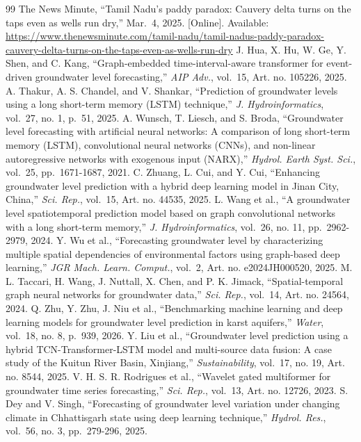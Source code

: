 \documentclass[conference]{IEEEtran}
\begin{document}
\begin{thebibliography}{99}
 The News Minute, ``Tamil Nadu's paddy paradox: Cauvery delta turns on the taps even as wells run dry,'' Mar.~4, 2025. {[}Online{]}. Available: \url{https://www.thenewsminute.com/tamil-nadu/tamil-nadus-paddy-paradox-cauvery-delta-turns-on-the-taps-even-as-wells-run-dry}
 J. Hua, X. Hu, W. Ge, Y. Shen, and C. Kang, ``Graph-embedded time-interval-aware transformer for event-driven groundwater level forecasting,'' \emph{AIP Adv.}, vol.~15, Art. no. 105226, 2025.
 A. Thakur, A. S. Chandel, and V. Shankar, ``Prediction of groundwater levels using a long short-term memory (LSTM) technique,'' \emph{J. Hydroinformatics}, vol.~27, no. 1, p.~51, 2025.
 A. Wunsch, T. Liesch, and S. Broda, ``Groundwater level forecasting with artificial neural networks: A comparison of long short-term memory (LSTM), convolutional neural networks (CNNs), and non-linear autoregressive networks with exogenous input (NARX),'' \emph{Hydrol. Earth Syst. Sci.}, vol.~25, pp.~1671-1687, 2021.
 C. Zhuang, L. Cui, and Y. Cui, ``Enhancing groundwater level prediction with a hybrid deep learning model in Jinan City, China,'' \emph{Sci. Rep.}, vol.~15, Art. no. 44535, 2025.
 L. Wang et al., ``A groundwater level spatiotemporal prediction model based on graph convolutional networks with a long short-term memory,'' \emph{J. Hydroinformatics}, vol.~26, no. 11, pp.~2962-2979, 2024.
 Y. Wu et al., ``Forecasting groundwater level by characterizing multiple spatial dependencies of environmental factors using graph-based deep learning,'' \emph{JGR Mach. Learn. Comput.}, vol.~2, Art. no. e2024JH000520, 2025.
 M. L. Taccari, H. Wang, J. Nuttall, X. Chen, and P. K. Jimack, ``Spatial-temporal graph neural networks for groundwater data,'' \emph{Sci. Rep.}, vol.~14, Art. no. 24564, 2024.
 Q. Zhu, Y. Zhu, J. Niu et al., ``Benchmarking machine learning and deep learning models for groundwater level prediction in karst aquifers,'' \emph{Water}, vol.~18, no. 8, p.~939, 2026.
 Y. Liu et al., ``Groundwater level prediction using a hybrid TCN-Transformer-LSTM model and multi-source data fusion: A case study of the Kuitun River Basin, Xinjiang,'' \emph{Sustainability}, vol.~17, no. 19, Art. no. 8544, 2025.
 V. H. S. R. Rodrigues et al., ``Wavelet gated multiformer for groundwater time series forecasting,'' \emph{Sci. Rep.}, vol.~13, Art. no. 12726, 2023.
 S. Dey and V. Singh, ``Forecasting of groundwater level variation under changing climate in Chhattisgarh state using deep learning technique,'' \emph{Hydrol. Res.}, vol.~56, no. 3, pp.~279-296, 2025.

\end{thebibliography}
\end{document}
